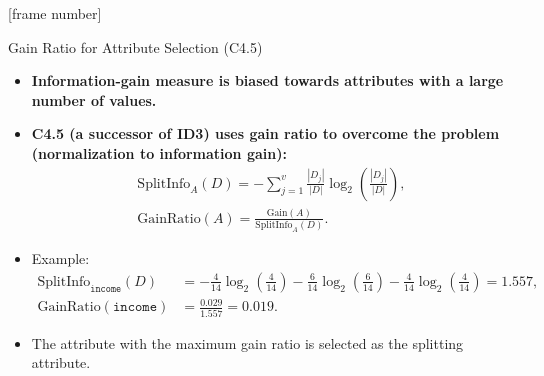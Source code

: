 \documentclass[aspectratio=169,t,table]{beamer}
\begin{document}
  {
    [frame number]
    \begin{frame}{Gain Ratio for Attribute Selection (C4.5)}
      \begin{itemize}
        \item \textbf{Information-gain measure is biased towards attributes with a large number of values.}
        \item \textbf{C4.5 (a successor of ID3) uses gain ratio to overcome the problem (normalization to information gain):}
        \begin{align}
          \text{SplitInfo}_A(D) = - \sum_{j=1}^{v} \frac{|D_j|}{|D|} \log_2\left( \frac{|D_j|}{|D|} \right),\\
          \text{GainRatio}(A) = \frac{\text{Gain}(A)}{\text{SplitInfo}_A(D)}.
        \end{align}
        \item Example:
        \begin{align}
          \text{SplitInfo}_{\texttt{income}}(D) &= -\frac{4}{14} \log_2 \left( \frac{4}{14} \right) - \frac{6}{14} \log_2 \left( \frac{6}{14} \right) - \frac{4}{14} \log_2 \left( \frac{4}{14} \right) = 1.557,\\
          \text{GainRatio}(\texttt{income}) &= \frac{0.029}{1.557} = 0.019.
        \end{align}
        \item The attribute with the maximum gain ratio is selected as the splitting attribute.
      \end{itemize}
    \end{frame}
  }
\end{document}
